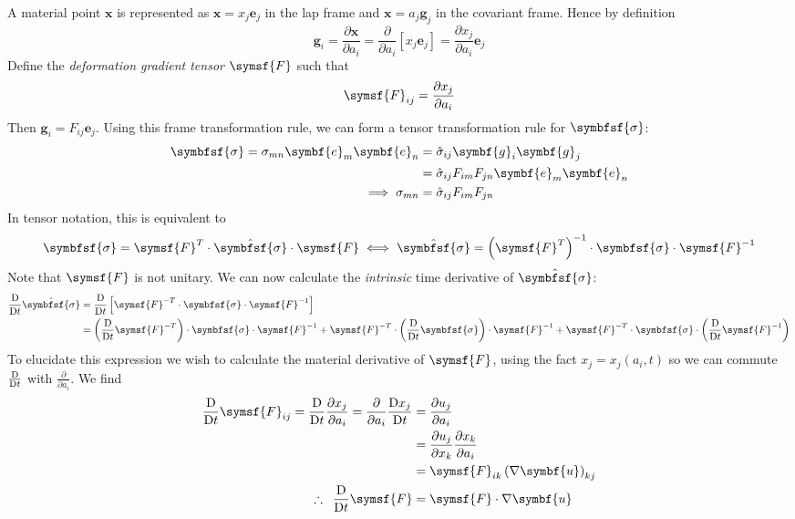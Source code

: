 \documentclass{jknotes}
\begin{document}
A material point $\symbf{x}$ is represented as $\symbf{x} = x_j \symbf{e}_j$
in the lap frame and $\symbf{x} = a_j \symbf{g}_j$ in the covariant frame.
Hence by definition
\begin{equation}
	\symbf{g}_i = \frac{\partial \symbf{x}}{\partial a_i} =
	\frac{\partial}{\partial a_i} \left[ x_j \symbf{e}_j\right] =
	\frac{\partial x_j}{\partial a_i} \symbf{e}_j
\end{equation}
Define the \emph{deformation gradient tensor} $\symsf{F}$ such that
\begin{equation}
	\symsf{F}_{ij} = \frac{\partial x_j}{\partial a_i}
\end{equation}
Then $\symbf{g}_i = F_{ij} \symbf{e}_j$. Using this frame transformation rule,
we can form a tensor transformation rule for $\symbfsf{\sigma}$:
\begin{align}
	\symbfsf{\sigma} = \sigma_{mn} \symbf{e}_m \symbf{e}_n &= \hat{\sigma}_{ij}
	\symbf{g}_i \symbf{g}_j  \\
	&= \hat{\sigma}_{ij} F_{im} F_{jn} \symbf{e}_m \symbf{e}_n \\
	\implies \sigma_{mn} &= \hat{\sigma}_{ij} F_{im} F_{jn}
\end{align}
In tensor notation, this is equivalent to
\begin{equation}
	\symbfsf{\sigma} = \symsf{F}^T \cdot \hat{\symbfsf{\sigma}} \cdot
	\symsf{F} \iff \hat{\symbfsf{\sigma}} = \left( \symsf{F}^T\right)^{-1}
	\cdot \symbfsf{\sigma} \cdot \symsf{F}^{-1}
\end{equation}
Note that $\symsf{F}$ is not unitary. We can now calculate the
\emph{intrinsic} time derivative of $\hat{\symbfsf{\sigma}}$:
\begin{align}
	\frac{\diffD}{\diffD t} \hat{\symbfsf{\sigma}} &= \frac{\diffD}{\diffD t}
	\left[ \symsf{F}^{-T} \cdot \symbfsf{\sigma} \cdot \symsf{F}^{-1}\right]
	\\
	&= \left( \frac{\diffD}{\diffD t} \symsf{F}^{-T}\right) \cdot
	\symbfsf{\sigma} \cdot \symsf{F}^{-1} + \symsf{F}^{-T} \cdot \left(
	\frac{\diffD}{\diffD t} \symbfsf{\sigma}\right) \cdot \symsf{F}^{-1} +
	\symsf{F}^{-T} \cdot \symbfsf{\sigma}  \cdot \left( \frac{\diffD}{\diffD
	t} \symsf{F}^{-1}\right)
\end{align}
To elucidate this expression we wish to calculate the material derivative of
$\symsf{F}$, using the fact $x_j = x_j(a_i,t)$ so we can commute
$\frac{\mathrm{D}}{\mathrm{D} t}$ with $\frac{\partial}{\partial a_i}$. We find
\begin{align}
	\frac{\diffD}{\diffD t} \symsf{F}_{ij} = \frac{\diffD}{\diffD t}
	\frac{\partial x_j}{\partial a_i} = \frac{\partial}{\partial a_i}
	\frac{\diffD x_j}{\diffD t} &= \frac{\partial u_j}{\partial a_i} \\
						&=
	\frac{\partial u_j}{\partial x_k} \frac{\partial x_k}{\partial a_i} \\
	&= \symsf{F}_{ik} \left(\nabla \symbf{u}\right)_{kj}\\
	\therefore\,\,\, \frac{\diffD}{\diffD t} \symsf{F} &= \symsf{F} \cdot \nabla
	\symbf{u}
\end{align}
\end{document}

